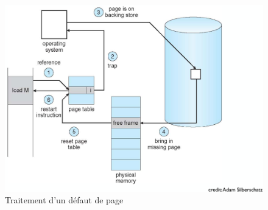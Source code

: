 \begin{figure}
\centering
\includegraphics{image-58.png}
\caption{Traitement d'un défaut de page}
\end{figure}
